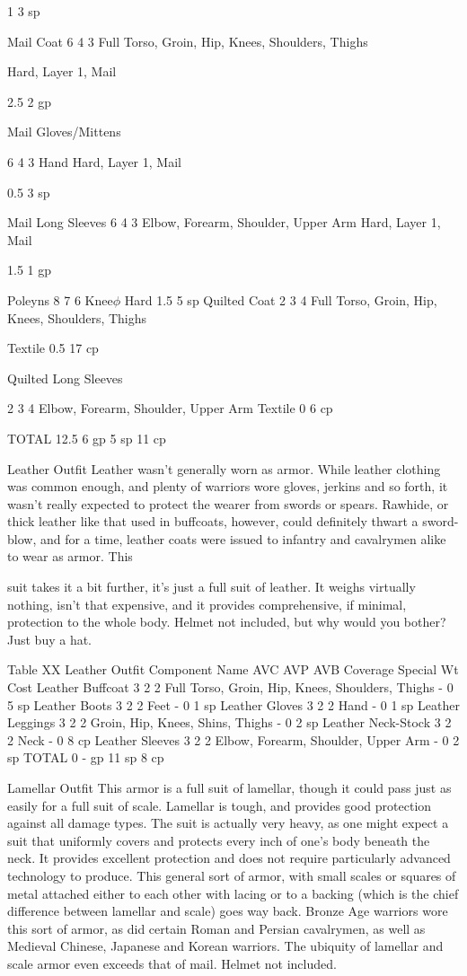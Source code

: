 \documentclass[oneside,11pt,english]{book}
\begin{document}
1 3 sp 

Mail Coat 6 4 3 Full Torso, Groin, Hip, Knees, Shoulders, 
Thighs 

Hard, Layer 1, 
Mail 

2.5 2 gp 

Mail 
Gloves/Mittens 

6 4 3 Hand Hard, Layer 1, 
Mail 

0.5 3 sp 

Mail Long Sleeves 6 4 3 Elbow, Forearm, Shoulder, Upper Arm Hard, Layer 1, 
Mail 

1.5 1 gp 

Poleyns 8 7 6 Knee$\phi$ Hard 1.5 5 sp 
Quilted Coat 2 3 4 Full Torso, Groin, Hip, Knees, Shoulders, 
Thighs 

Textile 0.5 17 cp 

Quilted Long 
Sleeves 

2 3 4 Elbow, Forearm, Shoulder, Upper Arm Textile 0 6 cp 

TOTAL 12.5 6 gp 
5 sp 
11 
cp 

 

Leather Outfit 
Leather wasn't generally worn as armor. While leather clothing was common enough, and plenty of 
warriors wore gloves, jerkins and so forth, it wasn't really expected to protect the wearer from swords or 
spears. Rawhide, or thick leather like that used in buffcoats, however, could definitely thwart a sword-
blow, and for a time, leather coats were issued to infantry and cavalrymen alike to wear as armor. This 


suit takes it a bit further, it's just a full suit of leather. It weighs virtually nothing, isn’t that expensive, and 
it provides comprehensive, if minimal, protection to the whole body. Helmet not included, but why would 
you bother? Just buy a hat. 

 
Table XX Leather Outfit 
Component Name AVC AVP AVB Coverage Special Wt Cost 
Leather Buffcoat 3 2 2 Full Torso, Groin, Hip, Knees, Shoulders, Thighs - 0 5 sp 
Leather Boots 3 2 2 Feet - 0 1 sp 
Leather Gloves 3 2 2 Hand - 0 1 sp 
Leather Leggings 3 2 2 Groin, Hip, Knees, Shins, Thighs - 0 2 sp 
Leather Neck-Stock 3 2 2 Neck - 0 8 cp 
Leather Sleeves 3 2 2 Elbow, Forearm, Shoulder, Upper Arm - 0 2 sp 
TOTAL 0 - gp 
11 sp 
8 cp 

 

Lamellar Outfit 
This armor is a full suit of lamellar, though it could pass just as easily for a full suit of scale. Lamellar is 
tough, and provides good protection against all damage types. The suit is actually very heavy, as one 
might expect a suit that uniformly covers and protects every inch of one's body beneath the neck. It 
provides excellent protection and does not require particularly advanced technology to produce. This 
general sort of armor, with small scales or squares of metal attached either to each other with lacing or to 
a backing (which is the chief difference between lamellar and scale) goes way back. Bronze Age warriors 
wore this sort of armor, as did certain Roman and Persian cavalrymen, as well as Medieval Chinese, 
Japanese and Korean warriors. The ubiquity of lamellar and scale armor even exceeds that of mail. 
Helmet not included. 
\end{document}
